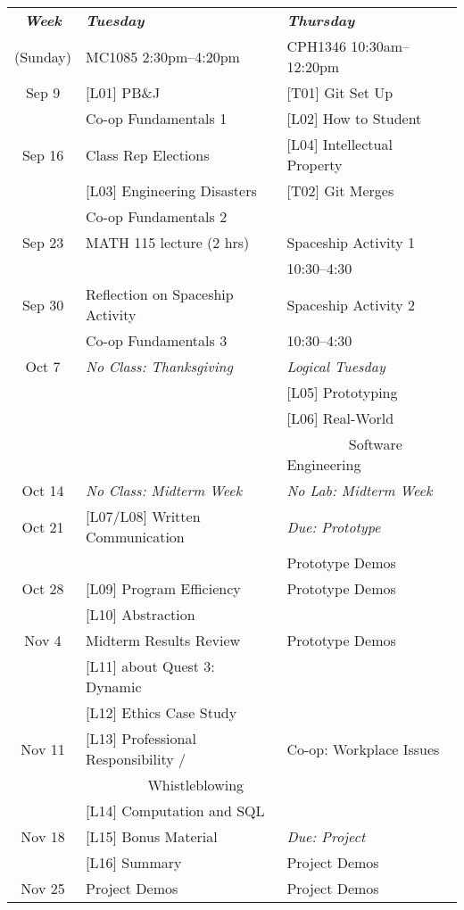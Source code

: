 \documentclass[11pt,onecolumn]{article}
\begin{document}
\begin{tabular}{cp{2.5in}p{2.5in}}
\textbf{\emph{Week}} & \textbf{\emph{Tuesday}} & \textbf{\emph{Thursday}} \\
(Sunday) & MC1085 2:30pm--4:20pm & CPH1346 10:30am--12:20pm \\ 
\hline
\hline \arrayrulecolor{lightgray}
Sep 9  & [L01] PB\&J & [T01] Git Set Up \\
       & Co-op Fundamentals 1 & [L02] How to Student \\
\hline
Sep 16 & Class Rep Elections &  [L04] Intellectual Property \\
       & [L03] Engineering Disasters & [T02] Git Merges \\
       & Co-op Fundamentals 2 & \\
\hline
Sep 23 & MATH 115 lecture (2 hrs) & Spaceship Activity 1 \\
       &  & 10:30--4:30 \\
\hline
Sep 30  & Reflection on Spaceship Activity & Spaceship Activity 2 \\
       & Co-op Fundamentals 3 & 10:30--4:30 \\
\hline
Oct 7 & \emph{No Class: Thanksgiving} & \emph{Logical Tuesday} \\
&  & [L05] Prototyping \\
&  & [L06] Real-World \\
&& ~~~~~~~~ Software Engineering \\
\hline
Oct 14 & \emph{No Class: Midterm Week} & \emph{No Lab: Midterm Week} \\
\hline
Oct 21 & [L07/L08] Written Communication & \emph{Due: Prototype} \\
       &  & Prototype Demos \\
\hline
Oct 28 & [L09] Program Efficiency & Prototype Demos \\
       & [L10] Abstraction & \\
\hline
Nov 4 & Midterm Results Review & Prototype Demos \\
      & [L11] about Quest 3: Dynamic & \\
      & [L12] Ethics Case Study & \\
\hline
Nov 11 & [L13] Professional Responsibility /  & Co-op: Workplace Issues \\
       & ~~~~~~~~  Whistleblowing \\
       & [L14] Computation and SQL & \\
\hline
Nov 18 & [L15] Bonus Material & \emph{Due: Project} \\
       & [L16] Summary & Project Demos \\
\hline
Nov 25 & Project Demos & Project Demos \\
\hline

\end{tabular}
\newpage
\end{document}
